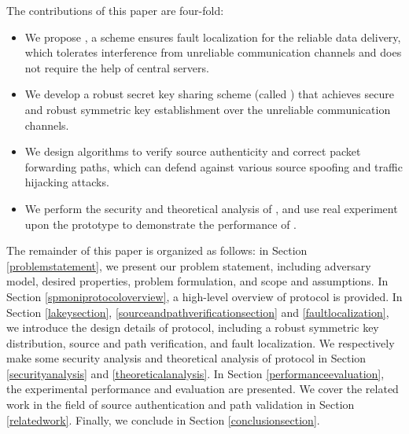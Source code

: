 The contributions of this paper are four-fold:
\begin{itemize}

\item We propose \name{}, a scheme ensures fault localization for the reliable data delivery, which tolerates interference from unreliable communication channels and does not require the help of central servers.

\item We develop a robust secret key sharing scheme (called \namekey{}) that achieves secure and robust symmetric key establishment over the unreliable communication channels.

\item We design algorithms to verify source authenticity and correct packet forwarding paths, which can defend against various source spoofing and traffic hijacking attacks.

\item We perform the security and theoretical analysis of \name{}, and use real experiment upon the \name{} prototype to demonstrate the performance of \name{}. 
\end{itemize}

The remainder of this paper is organized as follows: in Section \ref{problemstatement}, we present our problem statement, including adversary model, desired properties, problem formulation, and scope and assumptions. In Section \ref{spmoniprotocoloverview}, a high-level overview of \name{} protocol is provided. In Section \ref{lakeysection}, \ref{sourceandpathverificationsection} and \ref{faultlocalization}, we introduce the design details of \name{} protocol, including a robust symmetric key distribution, source and path verification, and fault localization. We respectively make some security analysis and theoretical analysis of \name{} protocol in Section \ref{securityanalysis} and \ref{theoreticalanalysis}. In Section \ref{performanceevaluation}, the experimental performance and evaluation are presented.%
We cover the related work in the field of source authentication and path validation in Section \ref{relatedwork}. Finally, we conclude in Section \ref{conclusionsection}. 